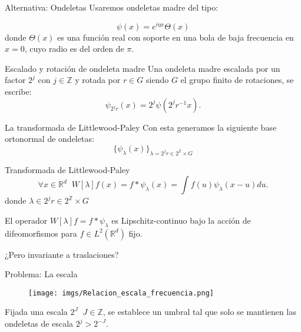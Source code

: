 \documentclass[aspectratio=43]{beamer}
\begin{document}
\begin{frame}{Alternativa: Ondeletas}
  Usaremos ondeletas madre del tipo: 

  \begin{equation*}
    \psi(x)=e^{i\eta x} \Theta(x)
  \end{equation*}
  donde $\Theta(x)$ es una función real con soporte en una bola de baja frecuencia en $x=0$, cuyo radio es del orden de $\pi$.

  \begin{block}{Escalado y rotación de ondeleta madre}
    Una ondeleta madre escalada por un factor $2^{j}$ con $j \in \mathbb{Z}$ y rotada por $r \in G$ siendo $G$ el grupo finito de rotaciones, se escribe: 
    $$\psi_{2^j r}(x)=2^{j} \psi(2^j r^{-1} x).$$
  \end{block}
\end{frame}

\begin{frame}{La transformada de Littlewood-Paley}
  Con esta generamos la siguiente base ortonormal de ondeletas: 
  \begin{equation*}
    \lbrace \psi_\lambda (x) \rbrace_{\lambda= 2^j r \in 2^\mathbb{Z} \times G}
  \end{equation*}

  \begin{block}{Transformada de Littlewood-Paley}
    \begin{equation*}
      \forall x \in  \mathbb{R}^d \;\; W[\lambda]f(x)= f \ast \psi_\lambda(x)=\int f(u)\psi_\lambda(x-u) du .
    \end{equation*}
    donde $\lambda \in 2^j r \in 2^\mathbb{Z} \times G$
  \end{block}

  El operador $W[\lambda]f=f\ast \psi_\lambda$ es Lipschitz-continuo bajo la acción de difeomorfismos para $f \in L^2(\mathbb{R}^d)$ fijo. 

  \medskip

  \textcolor{tudCyan}{¿Pero invariante a traslaciones?}
\end{frame}

\begin{frame}{Problema: La escala}
  \begin{figure}
    \centering
    \texttt{[image: imgs/Relacion\_escala\_frecuencia.png]}
  \end{figure}
  Fijada una escala $2^J \; \; J\in \mathbb{Z}$, se establece un umbral tal que solo se mantienen las ondeletas de escala $2^j > 2^{-J}$.
\end{frame}
\end{document}
